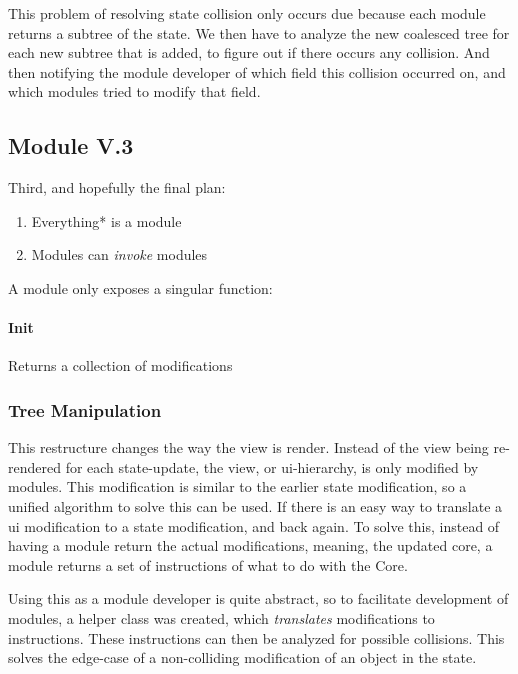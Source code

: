 This problem of resolving state collision only occurs due because each module
returns a subtree of the state. We then have to analyze the new coalesced tree
for each new subtree that is added, to figure out if there occurs any collision.
And then notifying the module developer of which field this collision occurred
on, and which modules tried to modify that field.

\subsection{Module V.3}

Third, and hopefully the final plan:

\begin{enumerate}
  \item Everything* is a module
  \item Modules can \textit{invoke} modules
\end{enumerate}

A module only exposes a singular function:

\paragraph{Init} Returns a collection of modifications


\subsubsection{Tree Manipulation}


This restructure changes the way the view is render. Instead of the view being
re-rendered for each state-update, the view, or \gls{ui}-hierarchy, is only
modified by modules. This modification is similar to the earlier state
modification, so a unified algorithm to solve this can be used. If there is an
easy way to translate a \gls{ui} modification to a state modification, and back
again. To solve this, instead of having a module return the actual
modifications, meaning, the updated core, a module returns a set of instructions
of what to do with the Core.

Using this as a module developer is quite abstract, so to facilitate development
of modules, a helper class was created, which \textit{translates} modifications
to instructions. These instructions can then be analyzed for possible
collisions. This solves the edge-case of a non-colliding modification of an
object in the state.

